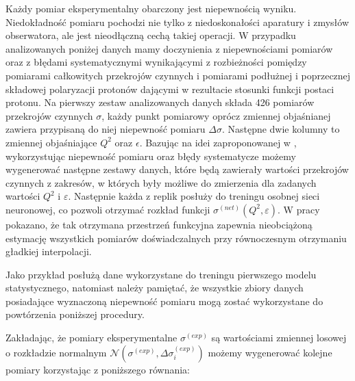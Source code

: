 \documentclass[11pt]{book}
\theoremstyle{definition}
\begin{document}
Każdy pomiar eksperymentalny obarczony jest niepewnością wyniku. Niedokładność pomiaru pochodzi nie tylko z niedoskonałości aparatury i zmysłów obserwatora, ale jest nieodłączną cechą takiej operacji. W przypadku analizowanych poniżej danych mamy doczynienia z niepewnościami pomiarów oraz z błędami systematycznymi wynikającymi z rozbieżności pomiędzy pomiarami całkowitych przekrojów czynnych i pomiarami podłużnej i poprzecznej składowej polaryzacji protonów dającymi w rezultacie stosunki funkcji postaci protonu. Na pierwszy zestaw analizowanych danych składa 426 pomiarów przekrojów czynnych $\sigma$, każdy punkt pomiarowy oprócz zmiennej objaśnianej zawiera przypisaną do niej niepewność pomiaru $\Delta \sigma$. Następne dwie kolumny to zmiennej objaśniające $Q^2$ oraz $\epsilon$. Bazując na idei zaproponowanej w \cite{2002JHEP...05..062F}, wykorzystując niepewność pomiaru oraz błędy systematycze możemy wygenerować następne zestawy danych, które będą zawierały wartości przekrojów czynnych z zakresów, w których były możliwe do zmierzenia dla zadanych wartości $Q^2$ i $\varepsilon$. Następnie każda z replik posłuży do treningu osobnej sieci neuronowej, co pozwoli otrzymać rozkład funkcji $\sigma^{(net)}(Q^2,\varepsilon)$. W pracy \cite{2002JHEP...05..062F} pokazano, że tak otrzymana przestrzeń funkcyjna zapewnia nieobciążoną estymację wszystkich pomiarów doświadczalnych przy równoczesnym otrzymaniu gładkiej interpolacji. 

Jako przykład posłużą dane wykorzystane do treningu pierwszego modelu statystycznego, natomiast należy pamiętać, że wszystkie zbiory danych posiadające wyznaczoną niepewność pomiaru mogą zostać wykorzystane do powtórzenia poniższej procedury. 

Zakładając, że pomiary eksperymentalne $\sigma^{(exp)}$ są wartościami zmiennej losowej o rozkładzie normalnym $\mathcal{N}\left( \sigma^{(exp)}, \Delta \sigma_i^{(exp)} \right)$  możemy wygenerować kolejne pomiary korzystając z poniższego równania:
\end{document}
